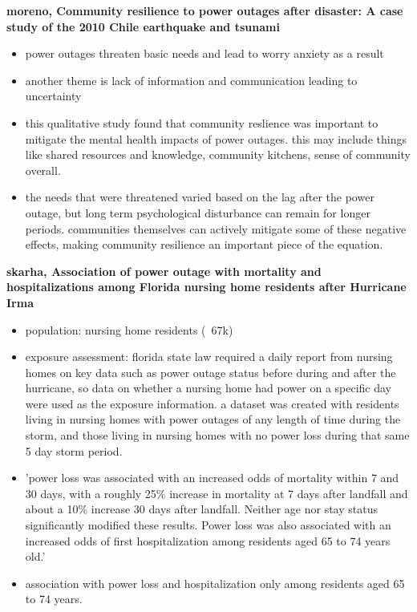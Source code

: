 \textbf{moreno, Community resilience to power outages after disaster: A case study of the 2010 Chile earthquake and tsunami}
\begin{itemize}
    \item power outages threaten basic needs and lead to worry anxiety as a result
    \item another theme is lack of information and communication leading to uncertainty
    \item this qualitative study found that community reslience was important to mitigate the mental health impacts of power outages. this may include things like shared resources and knowledge, community kitchens, sense of community overall. 
    \item the needs that were threatened varied based on the lag after the power outage, but long term psychological disturbance can remain for longer periods. communities themselves can actively mitigate some of these negative effects, making community resilience an important piece of the equation.
\end{itemize}

\textbf{skarha, Association of power outage with mortality and hospitalizations among Florida nursing home residents after Hurricane Irma}
\begin{itemize}
    \item population: nursing home residents (~67k)
    \item exposure assessment: florida state law required a daily report from nursing homes on key data such as power outage status before during and after the hurricane, so data on whether a nursing home had power on a specific day were used as the exposure information. a dataset was created with residents living in nursing homes with power outages of any length of time during the storm, and those living in nursing homes with no power loss during that same 5 day storm period.
    \item 'power loss was associated with an increased odds of mortality within 7 and 30 days, with a roughly 25\% increase in mortality at 7 days after landfall and about a 10\% increase 30 days after landfall. Neither age nor stay status significantly modified these results. Power loss was also associated with an increased odds of first hospitalization among residents aged 65 to 74 years old.'
    \item association with power loss and hospitalization only among residents aged 65 to 74 years.
\end{itemize}

